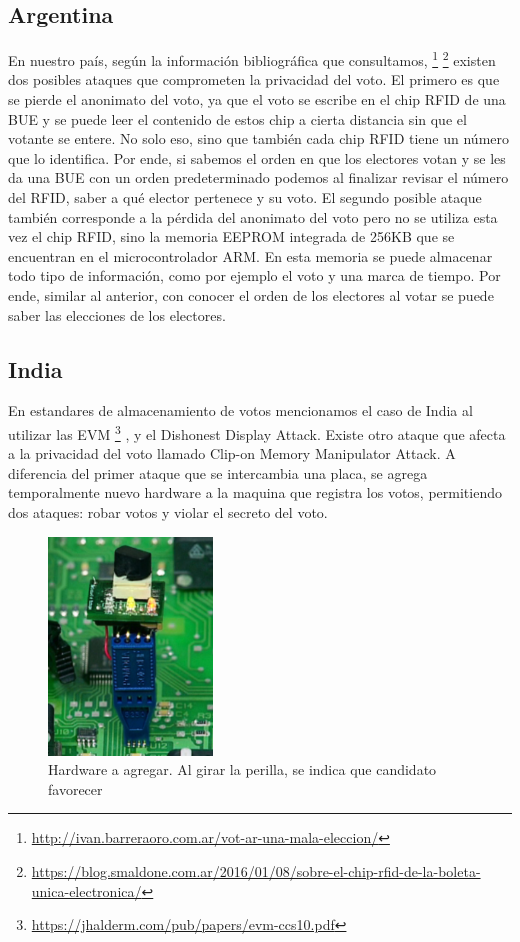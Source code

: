 \subsection{Argentina}
En nuestro país, según la información bibliográfica que consultamos,
\footnote{\url{http://ivan.barreraoro.com.ar/vot-ar-una-mala-eleccion/}}
\footnote{\url{https://blog.smaldone.com.ar/2016/01/08/sobre-el-chip-rfid-de-la-boleta-unica-electronica/}}
existen dos posibles ataques que comprometen la privacidad del voto.
El primero es que se pierde el anonimato del voto, ya que el voto se escribe en el chip RFID de una BUE y se puede leer el contenido de estos chip a cierta distancia sin que el votante se entere. No solo eso, sino que también cada chip RFID tiene un número que lo identifica. Por ende, si sabemos el orden en que los electores votan y se les da una BUE con un orden predeterminado podemos al finalizar revisar el número del RFID, saber a qué elector pertenece y su voto.
El segundo posible ataque también corresponde a la pérdida del anonimato del voto pero no se utiliza esta vez el chip RFID, sino la memoria EEPROM integrada de 256KB que se encuentran en el microcontrolador ARM. En esta memoria se puede almacenar todo tipo de información, como por ejemplo el voto y una marca de tiempo. Por ende, similar al anterior, con conocer el orden de los electores al votar se puede saber las elecciones de los electores.

\subsection{India}
En estandares de almacenamiento de votos mencionamos el caso de India al utilizar las EVM
\footnote{\url{https://jhalderm.com/pub/papers/evm-ccs10.pdf}}
, y el Dishonest Display Attack.
Existe otro ataque que afecta a la privacidad del voto llamado Clip-on Memory Manipulator Attack. A diferencia del primer ataque que se intercambia una placa, se agrega temporalmente nuevo hardware a la maquina que registra los votos, permitiendo dos ataques: robar votos y violar el secreto del voto. 
\begin{figure}[h!]
\includegraphics{Imagenes/privacidad2}
\caption{Hardware a agregar. Al girar la perilla, se indica que candidato favorecer}
\end{figure}

